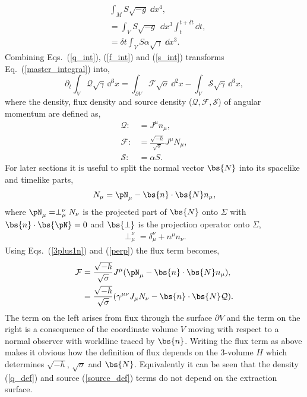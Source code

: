 \begin{align}
&\int_{M} S \sqrt{-g} \;\dd x^4 , \nonumber \\
&=\int_V S \sqrt{-g} \;\,\dd x^3 \int_t^{t+\delta t} \dd t,\\
 \label{s_int}&=\delta t \int_V S \alpha\sqrt{\gamma} \;\dd x^3 .
\end{align}
Combining Eqs.~(\ref{q_int}), (\ref{f_int}) and (\ref{s_int}) transforms Eq.~(\ref{master_integral}) into,
\begin{equation} \label{qfs_system}
\partial_t \int_{V} \mathcal{Q} \sqrt{\gamma} \,\dd^3 x  = \int_{\partial V} \mathcal{F} \sqrt{\sigma} \,\dd^2 x  
 - \int_{V} \mathcal{S} \sqrt{\gamma} \,\dd^3 x,
\end{equation}
where the density, flux density and source density ($\mathcal{Q}, \mathcal{F}, \mathcal{S}$) of angular momentum are defined as,
\begin{align}
\label{q_def}\mathcal{Q} :&= J^\mu n_\mu , \\
\label{flux_def}\mathcal{F} :&= \frac{\sqrt{-h}}{\sqrt{\sigma}}J^\mu N_\mu , \\
\label{source_def}\mathcal{S} :&= \alpha S. 
\end{align} 
For later sections it is useful to split the normal vector $\bs{N}$ into its spacelike and timelike parts,
\begin{align}
\label{3plus1n}N_\mu = \pN_\mu - \bs{n} \cdot \bs{N} n_\mu,
\end{align}
where $\pN_\mu = \perp^\nu_\mu N_\nu$ is the projected part of $\bs{N}$ onto $\Sigma$ with $\bs{n}\cdot \bs{\pN}=0$ and $\bs{\perp}$ is the projection operator onto $\Sigma$,
\begin{align}
\label{perp} \perp^\nu_\mu = \delta^\nu_\mu + n^\mu n_\nu.
\end{align}
Using Eqs.~(\ref{3plus1n}) and (\ref{perp}) the flux term becomes, 
\begin{align}
\mathcal{F} &= \frac{\sqrt{-h}}{\sqrt{\sigma}}J^\mu (\pN_\mu - \bs{n} \cdot \bs{N} n_\mu), \\
  \label{3plus1f} &= \frac{\sqrt{-h}}{\sqrt{\sigma}} (\gamma^{\mu\nu} J_\mu N_\nu - \bs{n} \cdot \bs{N} \mathcal{Q}).
\end{align}
The term on the left arises from flux through the surface $\partial V$ and the term on the right is a consequence of the coordinate volume $V$ moving with respect to a normal observer with worldline traced by $\bs{n}$. Writing the flux term as above makes it obvious how the definition of flux depends on the 3-volume $H$ which determines $\sqrt{-h}$, $\sqrt{\sigma}$ and $\bs{N}$. Equivalently it can be seen that the density (\ref{q_def}) and source (\ref{source_def}) terms do not depend on the extraction surface.


